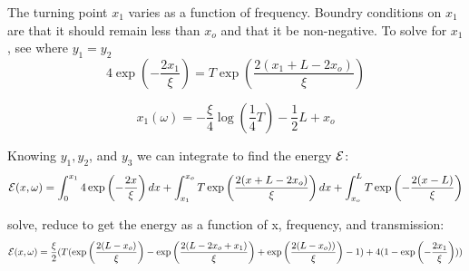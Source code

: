 The turning point $x_1$ varies as a function of frequency. Boundry conditions on $x_1$ are that it should remain less than $x_o$ and that it be non-negative. To solve for $x_1$, see where $y_1=y_2$
\begin{equation}
4 \exp\left(-\frac{2 x_1}{\xi}\right) = T \exp\left(\frac{2(x_1+L-2 x_o)}{\xi}\right)
\end{equation}

\begin{equation}
\boxed{x_1(\omega) = -\frac{\xi}{4} \log(\frac{1}{4} T) - \frac{1}{2}L + x_o}
\end{equation}

Knowing $y_1,y_2$, and $y_3$ we can integrate to find the energy ${\cal E}$:
\begin{equation}
{\cal E}(x,\omega) = \int _0 ^{x_1} 4 \exp\left(-\frac{2 x}{\xi}\right) dx +
    \int _{x_1} ^{x_o} T \exp\left(\frac{2(x+L-2 x_o)}{\xi}\right) dx + 
    \int _{x_o} ^{L} T \exp\left(-\frac{2(x-L)}{\xi}\right)
\label{fig:Eintegral}
\end{equation}

solve, reduce to get the energy as a function of x, frequency, and transmission:
\begin{equation}
{\cal E}(x,\omega) = \frac{\xi}{2} ( T ( \exp\left(\frac{2(L-x_o)}{\xi}\right) - \exp\left(\frac{2(L-2 x_o+x_1)}{\xi}\right) + \exp\left(\frac{2(L-x_o))}{\xi}\right) -1 ) + 4 (1-\exp\left(-\frac{2 x_1}{\xi}\right)) )
\label{fig:appendixenergy}
\end{equation}


